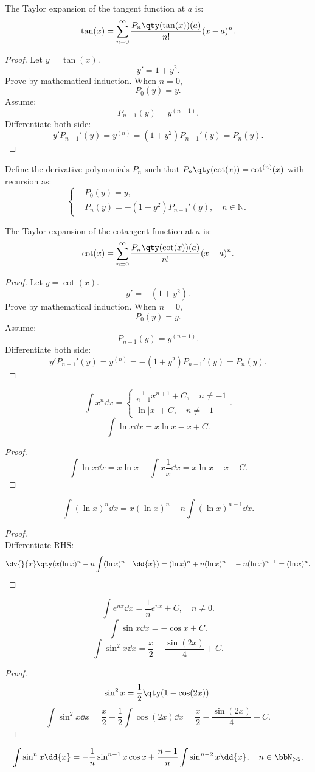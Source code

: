 \documentclass[a4paper,12pt]{report}
\begin{document}
\begin{itemize}
\begin{itemize}
The Taylor expansion of the tangent function at $a$ is:
\[\tan(x)=\sum_{n=0}^{\infty}\frac{P_n\qty(\tan(x))(a)}{n!}(x-a)^n.\]
\begin{proof}\mbox{}
Let $y=\tan(x)$.
\[y'=1+y^2.\]
Prove by mathematical induction. When $n=0$,
\[P_0(y)=y.\]
Assume:
\[P_{n-1}(y)=y^{(n-1)}.\]
Differentiate both side:
\[y'P_{n-1}'(y)=y^{(n)}=(1+y^2)P_{n-1}'(y)=P_n(y).\]
\end{proof}
Define the derivative polynomials $P_n$ such that $P_n\qty(\cot(x))=\cot^{(n)}(x)$ with recursion as:
\[\begin{cases}
&P_0(y)=y,\\
&P_n(y)=-(1+y^2)P_{n-1}'(y),\quad n\in\mathbb{N}.
\end{cases}\]

The Taylor expansion of the cotangent function at $a$ is:
\[\cot(x)=\sum_{n=0}^{\infty}\frac{P_n\qty(\cot(x))(a)}{n!}(x-a)^n.\]
\begin{proof}\mbox{}
Let $y=\cot(x)$.
\[y'=-(1+y^2).\]
Prove by mathematical induction. When $n=0$,
\[P_0(y)=y.\]
Assume:
\[P_{n-1}(y)=y^{(n-1)}.\]
Differentiate both side:
\[y'P_{n-1}'(y)=y^{(n)}=-(1+y^2)P_{n-1}'(y)=P_n(y).\]
\end{proof}
\[\int x^n\dd{x}=\begin{cases}\frac{1}{n+1}x^{n+1}+C,\quad n\neq -1\\\ln|x|+C,\quad n\neq -1\end{cases}.\]
\[\int\ln x\dd{x}=x\ln x-x+C.\]
\begin{proof}
    \[\int\ln x\dd{x}=x\ln x-\int x\frac{1}{x}\dd{x}=x\ln x-x+C.\]
\end{proof}
\[\int(\ln x)^n\dd{x}=x(\ln x)^n-n\int(\ln x)^{n-1}\dd{x}.\]
\begin{proof}\mbox{}\\
    Differentiate RHS:
    \[\dv{}{x}\qty(x(\ln x)^n-n\int(\ln x)^{n-1}\dd{x})=(\ln x)^n+n(\ln x)^{n-1}-n(\ln x)^{n-1}=(\ln x)^n.\]
\end{proof}
\[\int e^{nx}\dd{x}=\frac{1}{n}e^{nx}+C,\quad n\neq 0.\]
\[\int\sin x\dd{x}=-\cos x+C.\]
\[\int\sin^2 x\dd{x}=\frac{x}{2}-\frac{\sin(2x)}{4}+C.\]
\begin{proof}
    \[\sin^2 x=\frac{1}{2}\qty(1-\cos(2x)).\]
    \[\int\sin^2 x\dd{x}=\frac{x}{2}-\frac{1}{2}\int\cos(2x)\dd{x}=\frac{x}{2}-\frac{\sin(2x)}{4}+C.\]
\end{proof}
\[\int\sin^n x\dd{x}=-\frac{1}{n}\sin^{n-1}x\cos x+\frac{n-1}{n}\int\sin^{n-2}x\dd{x},\quad n\in\bbN_{>2}.\]

\end{itemize}
\end{itemize}
\end{document}
